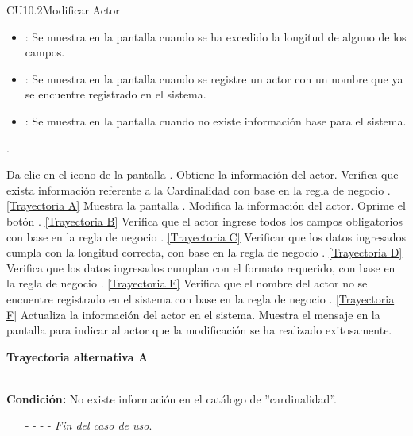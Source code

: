 \begin{UseCase}{CU10.2}{Modificar Actor}
{\begin{itemize}
		\item {}: Se muestra en la pantalla  cuando se ha excedido la longitud de alguno de los campos.
		\item {}: Se muestra en la pantalla  cuando se registre un actor con un nombre que ya se encuentre registrado en el sistema.
		\item {}: Se muestra en la pantalla  cuando no existe información base para el sistema.
		\end{itemize}.
		}
	\end{UseCase}
	\begin{UCtrayectoria}
		\UCpaso[\UCactor] Da clic en el icono \editar de la pantalla .
		\UCpaso[\UCsist] Obtiene la información del actor.
		\UCpaso[\UCsist] Verifica que exista información referente a la Cardinalidad con base en la regla de negocio . \hyperlink{CU10-2:TAA}{[Trayectoria A]}
		\UCpaso[\UCsist] Muestra la pantalla .
		\UCpaso[\UCactor] Modifica la información del actor. \label{CU10.2-P6}
		\UCpaso[\UCactor] Oprime el botón . \hyperlink{CU10-2:TAB}{[Trayectoria B]} 
		\UCpaso[\UCsist] Verifica que el actor ingrese todos los campos obligatorios con base en la regla de negocio . \hyperlink{CU10-2:TAC}{[Trayectoria C]}
		\UCpaso[\UCsist] Verificar que los datos ingresados cumpla con la longitud correcta, con base en la regla de negocio . \hyperlink{CU10-2:TAD}{[Trayectoria D]}
		\UCpaso[\UCsist] Verifica que los datos ingresados cumplan con el formato requerido, con base en la regla de negocio . \hyperlink{CU10-2:TAE}{[Trayectoria E]}
		\UCpaso[\UCsist] Verifica que el nombre del actor no se encuentre registrado en el sistema con base en la regla de negocio . \hyperlink{CU10-2:TAF}{[Trayectoria F]} 
		\UCpaso[\UCsist] Actualiza la información del actor en el sistema.
		\UCpaso[\UCsist] Muestra el mensaje  en la pantalla  para indicar al actor que la modificación se ha realizado exitosamente.
	\end{UCtrayectoria}		
\hypertarget{CU10-2:TAA}{\textbf{Trayectoria alternativa A}}\\
\noindent \textbf{Condición:} No existe información en el catálogo de ''cardinalidad''.
\begin{enumerate}
	\UCpaso[\UCactor] Muestra el mensaje  en la pantalla .
	\item[- -] - - {\em {Fin del caso de uso}}.%
\end{enumerate}

